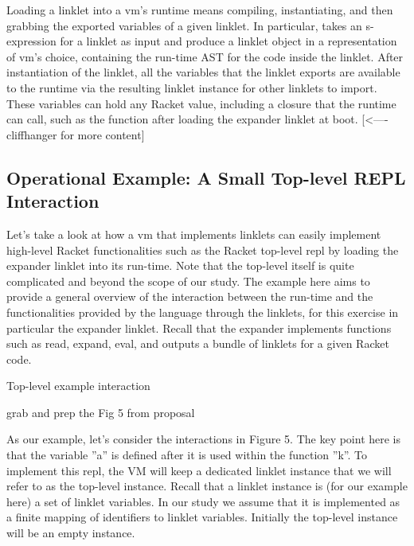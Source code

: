 		\begin{paragraph-here}
			Loading a linklet into a \gls{vm}'s runtime means compiling, instantiating, and then grabbing the exported variables of a given linklet. In particular,  takes an s-expression for a linklet as input and produce a linklet object in a representation of \gls{vm}'s choice, containing the run-time AST for the code inside the linklet. After instantiation of the linklet, all the variables that the linklet exports are available to the runtime via the resulting linklet instance for other linklets to import. These variables can hold any Racket value, including a closure that the runtime can call, such as the  function after loading the expander linklet at boot.  [<---- cliffhanger for more content]
		\end{paragraph-here}

		\subsection{Operational Example: A Small Top-level REPL Interaction}

		\begin{paragraph-here}
			Let’s take a look at how a \gls{vm} that implements linklets can easily implement high-level Racket functionalities such as the Racket top-level \gls{repl} by loading the expander linklet into its run-time. Note that the top-level itself is quite complicated and beyond the scope of our study. The example here aims to provide a general overview of the interaction between the run-time and the functionalities provided by the language through the linklets, for this exercise in particular the expander linklet. Recall that the expander implements functions such as read, expand, eval, and outputs a bundle of linklets for a given Racket code.
		\end{paragraph-here}




		\begin{figure-here}
			Top-level example interaction

			\begin{todo}
				grab and prep the Fig 5 from proposal
			\end{todo}
		\end{figure-here}

		\begin{paragraph-here}
			As our example, let’s consider the interactions in Figure 5. The key point here is that the variable ”a” is defined after it is used within the function ”k”. To implement this repl, the VM will keep a dedicated linklet instance that we will refer to as the top-level instance. Recall that a linklet instance is (for our example here) a set of linklet variables. In our study we assume that it is implemented as a finite mapping of identifiers to linklet variables. Initially the top-level instance will be an empty instance.
		\end{paragraph-here}

